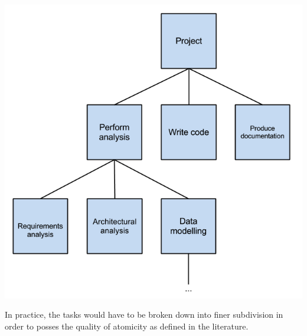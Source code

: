 \begin{center}
\includegraphics[scale=0.5]{TaskBreakdown.png}
\end{center}

In practice, the tasks would have to be broken down into finer subdivision in order to posses the quality of atomicity as defined in the literature.
